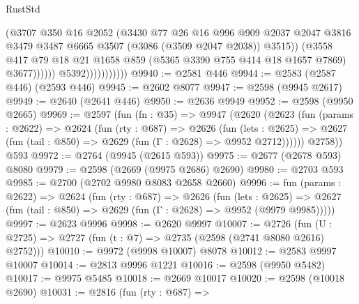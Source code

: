 \begin{lexlean}{RustStd}
\begin{coremodule}
                                    (@3707
                                      @350
                                      @16
                                      @2052
                                      (@3430
                                        @77
                                        @26
                                        @16
                                        @996
                                        @909
                                        @2037
                                        @2047
                                        @3816
                                        @3479
                                        @3487
                                        @6665
                                        @3507
                                        (@3086 (@3509 @2047 @2038))
                                        @3515))
                                    (@3558
                                      @417
                                      @79
                                      @18
                                      @21
                                      @1658
                                      @859
                                      (@5365 @3390 @755 @414 @18 @1657 @7869)
                                      @3677))))))
                          @5392)))))))))))
@9940 := @2581 @446
@9944 := @2583 (@2587 @446) (@2593 @446)
@9945 := @2602 @8077
@9947 := @2598 (@9945 @2617)
@9949 := @2640 (@2641 @446)
@9950 := @2636 @9949
@9952 := @2598 (@9950 @2665)
@9969 := @2597
    (fun (fn : @35) =>
    @9947
      (@2620
        (@2623
          (fun (params : @2622) =>
          @2624
            (fun (rty : @687) =>
            @2626
              (fun (lets : @2625) =>
              @2627 (fun (tail : @850) => @2629 (fun (Γ : @2628) => @9952 @2712))))))
        @2758))
    @593
@9972 := @2764 (@9945 (@2615 @593))
@9975 := @2677 (@2678 @593) @8080
@9979 := @2598 (@2669 (@9975 @2686) @2690)
@9980 := @2703 @593
@9985 := @2700 (@2702 @9980 @8083 @2658 @2660)
@9996 := fun (params : @2622) =>
  @2624
    (fun (rty : @687) =>
    @2626
      (fun (lets : @2625) =>
      @2627 (fun (tail : @850) => @2629 (fun (Γ : @2628) => @9952 (@9979 @9985)))))
@9997 := @2623 @9996
@9998 := @2620 @9997
@10007 := @2726 (fun (U : @2725) => @2727 (fun (t : @7) => @2735 (@2598 (@2741 @8080 @2616) @2752)))
@10010 := @9972 (@9998 @10007) @8078
@10012 := @2583 @9997 @10007
@10014 := @2813 @9996 @1221
@10016 := @2598 (@9950 @5482)
@10017 := @9975 @5485
@10018 := @2669 @10017
@10020 := @2598 (@10018 @2690)
@10031 := @2816
    (fun (rty : @687) =>

\end{coremodule}
\end{lexlean}
